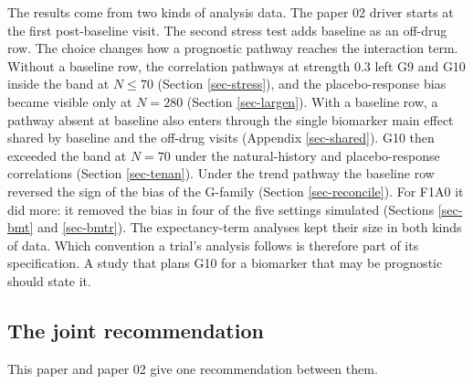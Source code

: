 \documentclass[
  11pt,
]{article}
\begin{document}
The results come from two kinds of analysis data. The paper 02
driver starts at the first post-baseline visit. The second stress test
adds baseline as an off-drug row. The choice changes how a prognostic
pathway reaches the interaction term. Without a baseline row, the
correlation pathways at strength 0.3 left G9 and G10 inside the band
at \(N \le 70\) (Section \ref{sec-stress}), and the placebo-response
bias became visible only at \(N = 280\) (Section \ref{sec-largen}).
With a baseline row, a pathway absent at baseline also enters through
the single biomarker main effect shared by baseline and the off-drug
visits (Appendix \ref{sec-shared}). G10 then exceeded the band at
\(N = 70\) under the natural-history and placebo-response correlations
(Section \ref{sec-tenan}). Under the trend pathway the baseline row
reversed the sign of the bias of the G-family (Section
\ref{sec-reconcile}). For F1A0 it did more: it removed the bias in
four of the five settings simulated (Sections \ref{sec-bmt} and
\ref{sec-bmtr}). The
expectancy-term analyses kept their size in both kinds of data. Which
convention a trial's analysis follows is therefore part of its
specification. A study that plans G10 for a biomarker that may be
prognostic should state it.

\subsection{The joint recommendation}\label{sec-recommend}

This paper and paper 02 give one recommendation between them.
\end{document}
